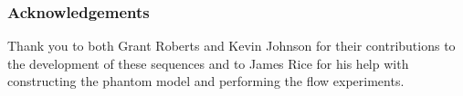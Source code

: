 \subsubsection{Acknowledgements}
Thank you to both Grant Roberts and Kevin Johnson for their contributions to the development of these sequences and to James Rice for his help with constructing the phantom model and performing the flow experiments. 